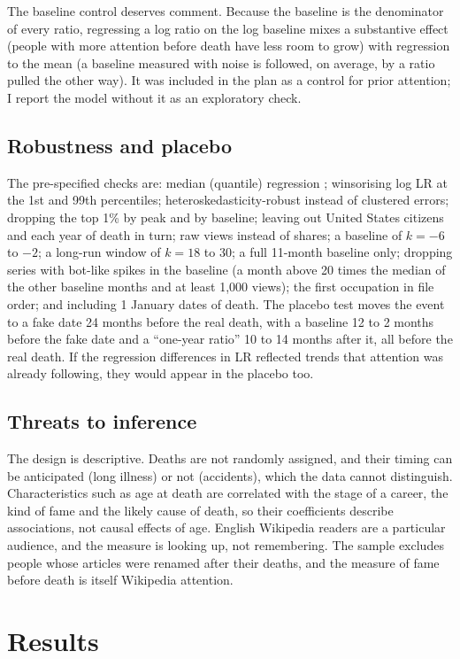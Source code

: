 \documentclass[11pt,a4paper]{article}
\begin{document}
The baseline control deserves comment. Because the baseline is the denominator of every ratio, regressing a log ratio on the log baseline mixes a substantive effect (people with more attention before death have less room to grow) with regression to the mean (a baseline measured with noise is followed, on average, by a ratio pulled the other way). It was included in the plan as a control for prior attention; I report the model without it as an exploratory check.

\subsection{Robustness and placebo}
The pre-specified checks are: median (quantile) regression \citep{koenker1978}; winsorising log LR at the 1st and 99th percentiles; heteroskedasticity-robust instead of clustered errors; dropping the top 1\% by peak and by baseline; leaving out United States citizens and each year of death in turn; raw views instead of shares; a baseline of $k = -6$ to $-2$; a long-run window of $k = 18$ to $30$; a full 11-month baseline only; dropping series with bot-like spikes in the baseline (a month above 20 times the median of the other baseline months and at least 1,000 views); the first occupation in file order; and including 1 January dates of death. The placebo test moves the event to a fake date 24 months before the real death, with a baseline 12 to 2 months before the fake date and a ``one-year ratio'' 10 to 14 months after it, all before the real death. If the regression differences in LR reflected trends that attention was already following, they would appear in the placebo too.

\subsection{Threats to inference}
The design is descriptive. Deaths are not randomly assigned, and their timing can be anticipated (long illness) or not (accidents), which the data cannot distinguish. Characteristics such as age at death are correlated with the stage of a career, the kind of fame and the likely cause of death, so their coefficients describe associations, not causal effects of age. English Wikipedia readers are a particular audience, and the measure is looking up, not remembering. The sample excludes people whose articles were renamed after their deaths, and the measure of fame before death is itself Wikipedia attention.

\section{Results}\label{sec:results}
\end{document}
